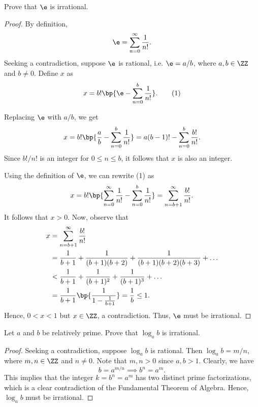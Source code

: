 \begin{problem}
    Prove that $\e$ is irrational.
\end{problem}
\begin{proof}
    By definition, \[\e = \sum_{n = 0}^\infty \frac1{n!}.\] Seeking a contradiction, suppose $\e$ is rational, i.e. $\e = a/b$, where $a, b \in \ZZ$ and $b \neq 0$. Define $x$ as \[x = b! \bp{\e - \sum_{n = 0}^b \frac1{n!}}. \tag{1}\]
    
    Replacing $\e$ with $a/b$, we get \[x = b! \bp{\frac{a}{b} - \sum_{n = 0}^b \frac1{n!}} = a(b-1)! - \sum_{n = 0}^b \frac{b!}{n!}.\] Since $b!/n!$ is an integer for $0 \leq n \leq b$, it follows that $x$ is also an integer.

    Using the definition of $\e$, we can rewrite (1) as \[x = b! \bp{\sum_{n = 0}^\infty \frac1{n!} - \sum_{n = 0}^b \frac1{n!}} = \sum_{n = b+1}^\infty \frac{b!}{n!}.\] It follows that $x > 0$. Now, observe that
    \begin{align*}
        x &= \sum_{n = b+1}^\infty \frac{b!}{n!}\\
        &= \frac1{b + 1} + \frac1{(b+1)(b+2)} + \frac1{(b+1)(b+2)(b+3)} + \dots\\
        &< \frac1{b+1} + \frac1{(b+1)^2} + \frac1{(b+1)^3} + \dots\\
        &= \frac1{b+1} \bp{\frac1{1 - \frac1{b+1}}} = \frac1b \leq 1.
    \end{align*}
    Hence, $0 < x < 1$ but $x \in \ZZ$, a contradiction. Thus, $\e$ must be irrational.
\end{proof}

\clearpage
\begin{problem}
    Let $a$ and $b$ be relatively prime. Prove that $\log_a b$ is irrational.
\end{problem}
\begin{proof}
    Seeking a contradiction, suppose $\log_a b$ is rational. Then $\log_a b = m/n$, where $m, n \in \ZZ$ and $n \neq 0$. Note that $m, n > 0$ since $a, b > 1$. Clearly, we have \[b = a^{m/n} \implies b^n = a^m.\] This implies that the integer $k = b^n = a^m$ has two distinct prime factorizations, which is a clear contradiction of the Fundamental Theorem of Algebra. Hence, $\log_a b$ must be irrational.
\end{proof}